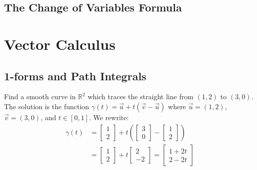 \documentclass[12pt]{book}
\newcommand{\R}{\mathbb{R}}
\newenvironment{exercise}[2][Exercise]{\begin{trivlist}
\item[\hskip \labelsep {\bfseries #1}\hskip \labelsep {\bfseries #2.}]}{\end{trivlist}}
\begin{document}
\begin{exercise}{7.2.7}
\section{The Change of Variables Formula}




\chapter{Vector Calculus}
\section{1-forms and Path Integrals}

\begin{exercise}{11.1.1}
    Find a smooth curve in $\R^2$ which traces the straight line from $(1,2)$ to $(3,0)$.\\

    The solution is the function $\gamma(t) = \vec{u} + t(\vec{v}-\vec{u})$ where $\vec{u}=(1,2)$, $\vec{v}=(3,0)$, and $t \in [0,1]$. We rewrite:
    \begin{align*}
    \gamma(t) &= \begin{bmatrix} 1 \\ 2 \end{bmatrix} + t \left(\begin{bmatrix} 3 \\ 0 \end{bmatrix}- \begin{bmatrix} 1 \\ 2 \end{bmatrix} \right) \\
              &= \begin{bmatrix} 1 \\ 2 \end{bmatrix} + t \begin{bmatrix} 2 \\ -2 \end{bmatrix} = \begin{bmatrix} 1 + 2 t\\ 2 - 2 t \end{bmatrix}
    \end{align*}
\end{exercise}



\end{exercise}
\end{document}
